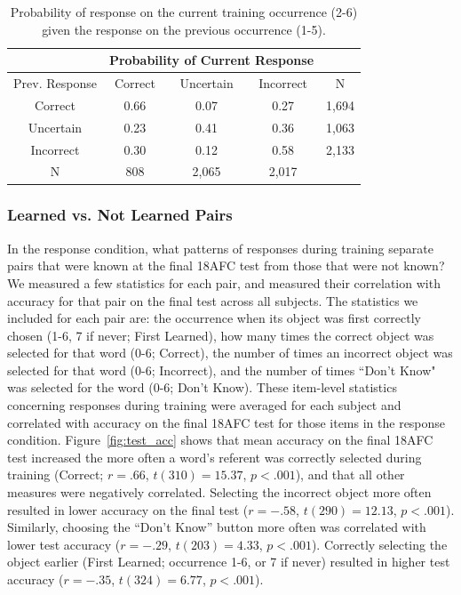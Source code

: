 \documentclass[man,floatsintext]{apa6}
\begin{document}
\begin{table}[ht] 
\begin{center}
\caption{Probability of response on the current training occurrence (2-6) given the response on the previous occurrence (1-5).} 
\label{tab:condprob_all} 
\vskip 0.05in
\begin{tabular}{c | c c c | c }
&  \multicolumn{3}{|c|}{Probability of Current Response} & \\
 \hline
Prev. Response & Correct & Uncertain & Incorrect  & N \\
\hline 
Correct	 & 0.66 & 0.07  &   0.27  & 1,694    \\
Uncertain  & 0.23 & 0.41  &   0.36   & 1,063    \\
Incorrect 	 & 0.30 & 0.12  &   0.58  & 2,133    \\
\hline
N              &   808 &   2,065 & 2,017  \\ 
\hline
\end{tabular} 
\end{center}
\end{table}


\subsubsection{Learned vs. Not Learned Pairs}

In the response condition, what patterns of responses during training separate pairs that were known at the final 18AFC test from those that were not known? We measured a few statistics for each pair, and measured their correlation with accuracy for that pair on the final test across all subjects. The statistics we included for each pair are: the occurrence when its object was first correctly chosen (1-6, 7 if never; First Learned), how many times the correct object was selected for that word (0-6; Correct), the number of times an incorrect object was selected for that word (0-6; Incorrect), and the number of times ``Don't Know" was selected for the word (0-6; Don't Know). These item-level statistics concerning responses during training were averaged for each subject and correlated with accuracy on the final 18AFC test for those items in the response condition. Figure~\ref{fig:test_acc} shows that mean accuracy on the final 18AFC test increased the more often a word's referent was correctly selected during training (Correct; $r=.66$, $t(310)=15.37$, $p<.001$), and that all other measures were negatively correlated. Selecting the incorrect object more often resulted in lower accuracy on the final test ($r=-.58$, $t(290)=12.13$, $p<.001$). Similarly, choosing the ``Don't Know'' button more often was correlated with lower test accuracy ($r=-.29$, $t(203)=4.33$, $p<.001$). Correctly selecting the object earlier (First Learned; occurrence 1-6, or 7 if never) resulted in higher test accuracy ($r=-.35$, $t(324)=6.77$, $p<.001$).
\end{document}
